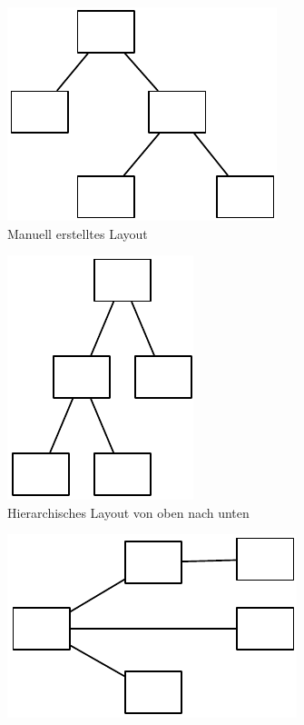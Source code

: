 \begin{figure}[hbt]
    \newcommand{\subfigureshortwidth}{0.28\textwidth}
    \newcommand{\subfigurelongwidth}{0.40\textwidth}
    \newcommand{\graphicsscale}{0.7}
    \centering
    \begin{subfigure}{\subfigureshortwidth}
        \centering
        \includegraphics[scale=\graphicsscale]{assets/omnigraffle-automatic-layout-a}
        \caption{Manuell erstelltes Layout}
        \label{fig:omnigraffle-automatic-layout-a}
    \end{subfigure}
    \begin{subfigure}{\subfigureshortwidth}
        \centering
        \includegraphics[scale=\graphicsscale]{assets/omnigraffle-automatic-layout-b}
        \caption{Hierarchisches Layout von oben nach unten}
        \label{fig:omnigraffle-automatic-layout-b}
    \end{subfigure}
    \begin{subfigure}{\subfigureshortwidth}
        \centering
        \includegraphics[scale=\graphicsscale]{assets/omnigraffle-automatic-layout-c}

\end{subfigure}
\end{figure}
